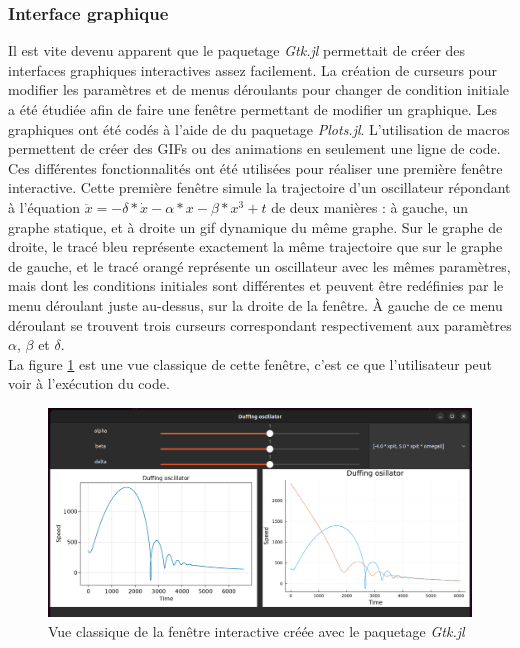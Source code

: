 \documentclass[a4paper, french, 12pt, titlepage]{article}
\begin{document}
\subsubsection{Interface graphique}

Il est vite devenu apparent que le paquetage \emph{Gtk.jl} permettait de créer des interfaces graphiques interactives assez facilement. La création de curseurs pour modifier les paramètres et de menus déroulants pour changer de condition initiale a été étudiée afin de faire une fenêtre permettant de modifier un graphique. Les graphiques ont été codés à l'aide de du paquetage \emph{Plots.jl}. L'utilisation de macros permettent de créer des GIFs ou des animations en seulement une ligne de code. Ces différentes fonctionnalités ont été utilisées pour réaliser une première fenêtre interactive. Cette première fenêtre simule la trajectoire d'un oscillateur répondant à l'équation $\ddot x = - \delta * \dot x - \alpha * x - \beta * x^3 + t $ de deux manières : à gauche, un graphe statique, et à droite un gif dynamique du même graphe. Sur le graphe de droite, le tracé bleu représente exactement la même trajectoire que sur le graphe de gauche, et le tracé orangé représente un oscillateur avec les mêmes paramètres, mais dont les conditions initiales sont différentes et peuvent être redéfinies par le menu déroulant juste au-dessus, sur la droite de la fenêtre. À gauche de ce menu déroulant se trouvent trois curseurs correspondant respectivement aux paramètres $\alpha$, $\beta$ et $\delta$. \\

La figure \ref{fig:interactive1} est une vue classique de cette fenêtre, c'est ce que l'utilisateur peut voir à l'exécution du code.\\

\begin{figure}[H]
  \includegraphics[width=\linewidth]{interactivewindow_1.png}
  \caption{Vue classique de la fenêtre interactive créée avec le paquetage \emph{Gtk.jl}}
  	\label{fig:interactive1}
\end{figure}
\end{document}
